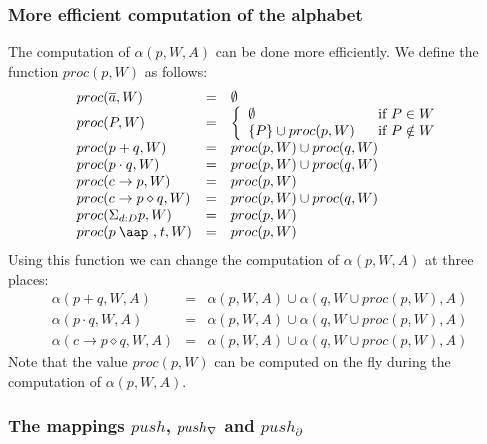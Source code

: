 \documentclass{article}
\providecommand{\at}{\mathbin{\mbox{\aap ,}}}
\begin{document}
\subsubsection{More efficient computation of the alphabet}

The computation of $\alpha (p,W,A)$ can be done more efficiently. We define
the function $proc(p,W)$ as follows:%
\[
\begin{array}{lll}
proc(\overline{a},W) & = & \emptyset  \\ 
proc(P,W) & = & \left\{ 
\begin{array}{ll}
\emptyset  & \text{if }P\in W \\ 
\{P\}\cup proc(p,W) & \text{if }P\notin W%
\end{array}%
\right.  \\ 
proc(p+q,W) & = & proc(p,W)\cup proc(q,W) \\ 
proc(p\cdot q,W) & = & proc(p,W)\cup proc(q,W) \\ 
proc(c\rightarrow p,W) & = & proc(p,W) \\ 
proc(c\rightarrow p\diamond q,W) & = & proc(p,W)\cup proc(q,W) \\ 
proc(\Sigma _{d:D}p,W) & = & proc(p,W) \\ 
proc(p\at t,W) & = & proc(p,W)%
\end{array}%
\]%
Using this function we can change the computation of $\alpha (p,W,A)$ at
three places:%
\[
\begin{array}{lll}
\alpha (p+q,W,A) & = & \alpha (p,W,A)\cup \alpha (q,W\cup proc(p,W),A) \\ 
\alpha (p\cdot q,W,A) & = & \alpha (p,W,A)\cup \alpha (q,W\cup proc(p,W),A)
\\ 
\alpha (c\rightarrow p\diamond q,W,A) & = & \alpha (p,W,A)\cup \alpha
(q,W\cup proc(p,W),A)%
\end{array}%
\]%
Note that the value $proc(p,W)$ can be computed on the fly during the
computation of $\alpha (p,W,A)$.

\subsubsection{The mappings $push$, $push_{\protect\nabla }$ and $%
push_{\partial }$}
\end{document}
